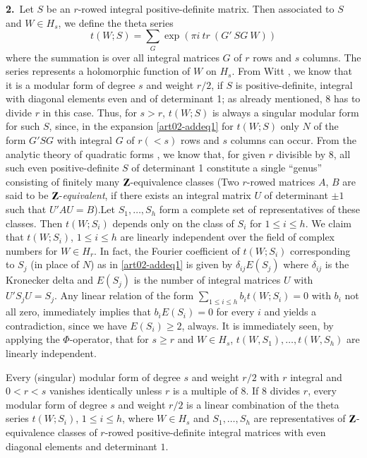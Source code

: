 {\bf 2.}~Let $S$ be an $r$-rowed integral positive-definite
matrix. Then associated to $S$ and $W\in H_{s}$, we define the theta
series
$$
t(W;S)=\sum_{G}\exp (\pi i\ tr \ (G'\ SG \ W))
$$
where the summation is over all integral matrices $G$ of $r$ rows and
$s$ columns. The series represents a holomorphic function of $W$ on
$H_{s}$. From Witt \cite{art02-key7}, we know that it is a modular
form of degree $s$ and weight $r/2$, if $S$ is positive-definite,
integral with diagonal elements even and of determinant 1; as already
mentioned, 8 has to divide $r$ in this case. Thus, for $s>r$, $t(W;S)$
is always a singular modular form for such $S$, since, in the
expansion \eqref{art02-addeq1} for $t(W;S)$ only $N$ of the form $G'SG$ with integral
$G$ of $r(<s)$ rows and $s$ columns can occur. From the analytic
theory of quadratic forms \cite{art02-key5}, we know that, for given
$r$ divisible by 8, all such even positive-definite $S$ of determinant
1 constitute a single ``genus'' consisting of finitely many
$\mathbf{Z}$-equivalence classes (Two $r$-rowed matrices $A$, $B$ are said
to be $\mathbf{Z}$-{\em equivalent}, if there exists an integral matrix $U$
of determinant $\pm 1$ such that $U'AU=B$).\pageoriginale Let
$S_{1},\ldots,S_{h}$ form a complete set of representatives of these
classes. Then $t(W;S_{i})$ depends only on the class of $S_{i}$ for
$1\leq i\leq h$. We claim that $t(W;S_{i})$, $1\leq i\leq h$ are
linearly independent over the field of complex numbers for $W\in
H_{r}$. In fact, the Fourier coefficient of $t(W;S_{i})$ corresponding
to $S_{j}$ (in place of $N$) as in \eqref{art02-addeq1} is given by
$\delta_{ij}E(S_{j})$ where $\delta_{ij}$ is the Kronecker delta and
$E(S_{j})$ is the number of integral matrices $U$ with
$U'S_{j}U=S_{j}$. Any linear relation of the form $\sum\limits_{1\leq
i\leq h}b_{i}t(W;S_{i})=0$ with $b_{i}$ not all zero, immediately
implies that $b_{i}E(S_{i})=0$ for every $i$ and yields a
contradiction, since we have $E(S_{i})\geq 2$, always. It is
immediately seen, by applying the $\Phi$-operator, that for $s\geq r$
and $W\in H_{s}$, $t(W,S_{1}),\ldots,t(W,S_{h})$ are linearly
independent.

\begin{theorem*}
Every (singular) modular form of degree $s$ and weight $r/2$ with $r$
integral and $0<r<s$ vanishes identically unless $r$ is a multiple of
$8$. If $8$ divides $r$, every modular form of degree $s$ and weight
$r/2$ is a linear combination of the theta series $t(W;S_{i})$, $1\leq
i\leq h$, where $W\in H_{s}$ and $S_{1},\ldots,S_{h}$ are
representatives of $\mathbf{Z}$-equivalence classes of $r$-rowed
positive-definite integral matrices with even diagonal elements and
determinant $1$.
\end{theorem*}

